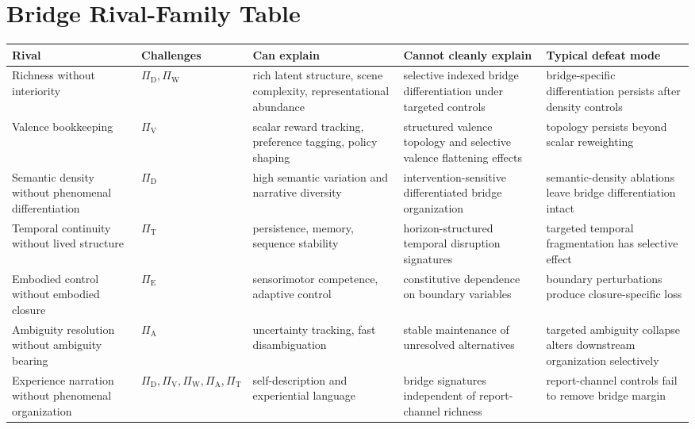 \documentclass[11pt,a4paper]{article}
\theoremstyle{definition}
\newcommand{\PiD}{\Pi_{\mathrm{D}}}
\newcommand{\PiV}{\Pi_{\mathrm{V}}}
\newcommand{\PiW}{\Pi_{\mathrm{W}}}
\newcommand{\PiA}{\Pi_{\mathrm{A}}}
\newcommand{\PiE}{\Pi_{\mathrm{E}}}
\newcommand{\PiT}{\Pi_{\mathrm{T}}}
\begin{document}
\section{Bridge Rival-Family Table}
\begin{center}
\small
\begin{tabularx}{\linewidth}{@{}>{\raggedright\arraybackslash}p{}>{\raggedright\arraybackslash}p{}>{\raggedright\arraybackslash}p{}>{\raggedright\arraybackslash}p{}>{\raggedright\arraybackslash}p{}@{}}
\toprule
Rival & Challenges & Can explain & Cannot cleanly explain & Typical defeat mode \\
\midrule
Richness without interiority & $\PiD,\allowbreak \PiW$ & rich latent structure, scene complexity, representational abundance & selective indexed bridge differentiation under targeted controls & bridge-specific differentiation persists after density controls \\
Valence bookkeeping & $\PiV$ & scalar reward tracking, preference tagging, policy shaping & structured valence topology and selective valence flattening effects & topology persists beyond scalar reweighting \\
Semantic density without phenomenal differentiation & $\PiD$ & high semantic variation and narrative diversity & intervention-sensitive differentiated bridge organization & semantic-density ablations leave bridge differentiation intact \\
Temporal continuity without lived structure & $\PiT$ & persistence, memory, sequence stability & horizon-structured temporal disruption signatures & targeted temporal fragmentation has selective effect \\
Embodied control without embodied closure & $\PiE$ & sensorimotor competence, adaptive control & constitutive dependence on boundary variables & boundary perturbations produce closure-specific loss \\
Ambiguity resolution without ambiguity bearing & $\PiA$ & uncertainty tracking, fast disambiguation & stable maintenance of unresolved alternatives & targeted ambiguity collapse alters downstream organization selectively \\
Experience narration without phenomenal organization & $\PiD,\allowbreak \PiV,\allowbreak \PiW,\allowbreak \PiA,\allowbreak \PiT$ & self-description and experiential language & bridge signatures independent of report-channel richness & report-channel controls fail to remove bridge margin \\
\bottomrule
\end{tabularx}
\end{center}
\end{document}
